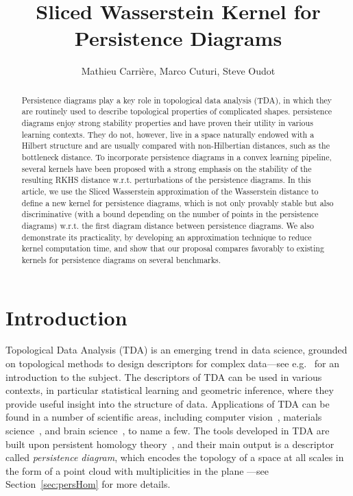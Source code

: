 \documentclass[11pt]{article}
\title{Sliced Wasserstein Kernel for Persistence Diagrams}
\author{Mathieu Carri\`ere, Marco Cuturi, Steve Oudot}
\date{}
\begin{document}
\maketitle

\begin{abstract}
Persistence diagrams play a key role in topological data
analysis (TDA), in which they are routinely used to describe
 topological properties of complicated shapes. persistence diagrams
enjoy strong stability properties and have proven their utility in
various learning contexts.  They do not, however, live in a space
naturally endowed with a Hilbert structure and are usually compared
with non-Hilbertian distances, such as the bottleneck distance. To
incorporate persistence diagrams in a convex learning pipeline, several kernels have been
proposed with a strong emphasis on the stability of the resulting RKHS
distance w.r.t. perturbations of the persistence diagrams.  In this article, we use the
Sliced Wasserstein approximation of the Wasserstein distance to
define a new kernel for persistence diagrams, which is not only provably stable but
also discriminative (with a bound depending on the number of points in the persistence diagrams) 
w.r.t. the first diagram distance between persistence diagrams. 
We also demonstrate its practicality, by
developing an approximation technique to reduce kernel computation
time, and show that our proposal compares favorably to existing
kernels for persistence diagrams on several benchmarks.
\end{abstract}

\section{Introduction}

Topological Data Analysis (TDA) is an emerging trend in data
science, grounded on topological methods to design descriptors
for complex data---see e.g.~\cite{Carlsson09b} for an introduction to
the subject.  The descriptors of TDA can be used in various contexts,
in particular statistical learning and geometric inference, where they
provide useful insight into the structure of data.  Applications
of TDA can be found in a number of scientific areas, including
computer vision~\cite{Li14}, materials science~\cite{Hiraoka16}, and
brain science~\cite{Singh08}, to name a few.  The tools developed in
TDA are built upon persistent homology
theory~\cite{Edelsbrunner10,Oudot15}, and their main output is a
descriptor called {\em persistence diagram}, which encodes the
topology of a space at all scales in the form of a point cloud with
multiplicities in the plane ---see Section~\ref{sec:persHom} for more details.
\end{document}

